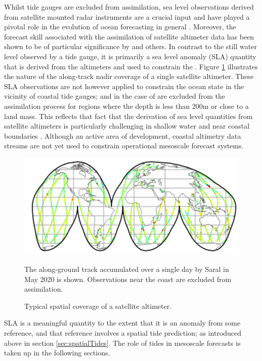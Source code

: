 Whilst tide gauges are excluded from assimilation, sea level observations derived from satellite mounted radar instruments are a crucial input and have played a pivotal role in the evolution of ocean forecasting in general \citep{Fu:2001ub}.  Moreover, the forecast skill associated with the assimilation of satellite altimeter data has been shown to be of particular significance by  \citet{10.5194/os-13-1077-2017} and others.
In contrast to the still water level observed by a tide gauge, it is primarily a sea level anomaly (SLA) quantity that is derived from the altimeters and used to constrain the \OGCM{}. Figure \ref{fig:altimeterEg} illustrates the nature of the along-track nadir coverage of a single satellite altimeter.
These SLA observations are not however applied to constrain the ocean state in the vicinity of coastal tide gauges; and in the case of \BL{} are excluded from the assimilation process for regions where the depth is less than 200m or close to a land mass.   This reflects that fact that the derivation of sea level quantities from satellite altimeters is particularly challenging in shallow water and near coastal boundaries \citep{Woodworth:2011bf}.    Although an active area of development, coastal altimetry data streams are not yet used to constrain operational mesoscale forecast  systems.
\begin{figure}[!hbt] \centering
  \includegraphics[width=\figwidthHalf]{figures/maps/altimeterCoverageEg.png}
  \caption{Typical spatial coverage of a satellite altimeter.}
          {The along-ground track accumulated over a single day by Saral in May 2020 is shown. Observations near the coast are excluded from assimilation.}
  \label{fig:altimeterEg}
\end{figure}
SLA is a meaningful quantity to the extent that it is an anomaly from some reference, and that reference involves a spatial tide prediction; as introduced above in section \ref{sec:spatialTides}.
The role of tides in mesoscale forecasts is taken up in the following sections.
